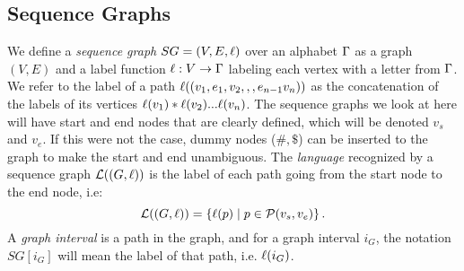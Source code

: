 \subsection{Sequence Graphs}
We define a \emph{sequence graph} $SG = (V, E, \ell)$ over an alphabet $\Gamma$ as a graph $(V, E)$ and a label function $\ell: V \rightarrow \Gamma$ labeling each vertex with a letter from $\Gamma$.
We refer to the label of a path $\ell((v_1, e_1, v_2,,,e_{n-1}v_n))$ as the concatenation of the labels of its vertices $\ell(v_1)*\ell(v_2) ... \ell(v_n)$.
The sequence graphs we look at here will have start and end nodes that are clearly defined, which will be denoted $v_s$ and $v_e$. If this were not the case, dummy nodes ($\#, \$$) can be inserted to the graph to make the start and end unambiguous.
The \emph{language} recognized by a sequence graph $\mathcal{L}((G, \ell))$ is the label of each path going from the start node to the end node, i.e:
\[
  \mathcal{L}((G, \ell)) = \left\{ \ell(p) \mid p \in \mathcal{P}(v_s, v_e)\right\}.
\]
A \emph{graph interval} is a path in the graph, and for a graph interval $i_G$, the notation  $SG[i_G]$ will mean the label of that path, i.e. $\ell(i_G)$.

